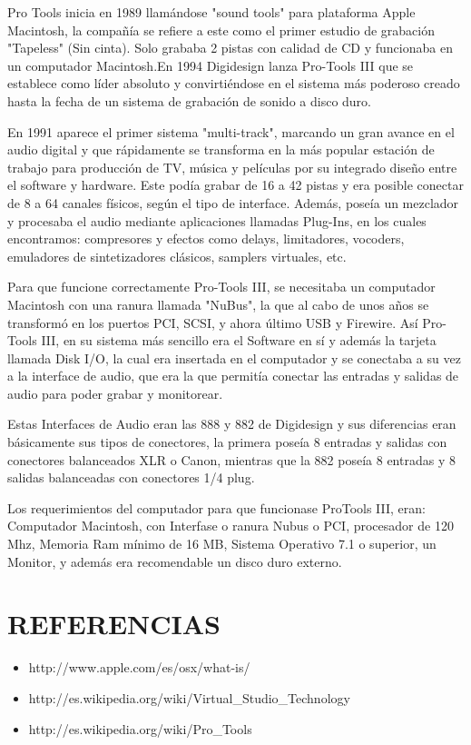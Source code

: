 Pro Tools inicia en 1989 llamándose "sound tools" para
plataforma Apple Macintosh, la compañía se refiere a este como
el primer estudio de grabación "Tapeless" (Sin cinta). Solo
grababa 2 pistas con calidad de CD y funcionaba en un
computador Macintosh.En 1994 Digidesign lanza Pro-Tools III
que se establece como líder absoluto y convirtiéndose en el
sistema más poderoso creado hasta la fecha de un sistema de
grabación de sonido a disco duro.

En 1991 aparece el primer sistema "multi-track", marcando un
gran avance en el audio digital y que rápidamente se transforma
en la más popular estación de trabajo para producción de TV,
música y películas por su integrado diseño entre el software y
hardware. Este podía grabar de 16 a 42 pistas y era posible
conectar de 8 a 64 canales físicos, según el tipo de interface.
Además, poseía un mezclador y procesaba el audio mediante
aplicaciones llamadas Plug-Ins, en los cuales encontramos:
compresores y efectos como delays, limitadores, vocoders,
emuladores de sintetizadores clásicos, samplers virtuales, etc.

Para que funcione correctamente Pro-Tools III, se necesitaba un
computador Macintosh con una ranura llamada "NuBus", la que
al cabo de unos años se transformó en los puertos PCI, SCSI, y
ahora último USB y Firewire. Así Pro-Tools III, en su sistema
más sencillo era el Software en sí y además la tarjeta llamada
Disk I/O, la cual era insertada en el computador y se conectaba a
su vez a la interface de audio, que era la que permitía conectar
las entradas y salidas de audio para poder grabar y monitorear.

Estas Interfaces de Audio eran las 888 y 882 de Digidesign y sus
diferencias eran básicamente sus tipos de conectores, la primera
poseía 8 entradas y salidas con conectores balanceados XLR o
Canon, mientras que la 882 poseía 8 entradas y 8 salidas
balanceadas con conectores 1/4 plug.

Los requerimientos del computador para que funcionase ProTools
III, eran: Computador Macintosh, con Interfase o ranura
Nubus o PCI, procesador de 120 Mhz, Memoria Ram mínimo de
16 MB, Sistema Operativo 7.1 o superior, un Monitor, y además
era recomendable un disco duro externo.

\section*{REFERENCIAS}
\begin{itemize}
  \item http://www.apple.com/es/osx/what-is/
  \item http://es.wikipedia.org/wiki/Virtual_Studio_Technology
  \item http://es.wikipedia.org/wiki/Pro_Tools
\end{itemize}


